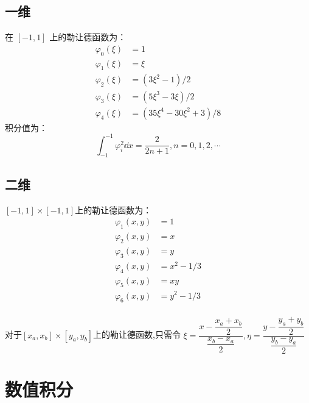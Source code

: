 \documentclass{book}
\begin{document}
\subsection{一维}
在 $[-1,1]$ 上的勒让德函数为：
\begin{equation}
    \begin{aligned}
        \varphi_{0}(\xi) & =1                                        \\
        \varphi_{1}(\xi) & =\xi                                      \\
        \varphi_{2}(\xi) & =\left(3 \xi^{2}-1\right) / 2             \\
        \varphi_{3}(\xi) & =\left(5 \xi^{3}-3 \xi\right) / 2         \\
        \varphi_{4}(\xi) & =\left(35 \xi^{4}-30 \xi^{2}+3\right) / 8
    \end{aligned}
\end{equation}
积分值为：
\begin{equation}
    \int_{-1}^{-1}\varphi_i^2\dd x=\frac{2}{2n+1},n=0,1,2,\cdots
\end{equation}

\subsection{二维}
$[-1,1]\times[-1,1]$上的勒让德函数为：
\begin{equation}
    \begin{aligned}
        \varphi_{1}(x,y) & = 1       \\
        \varphi_{2}(x,y) & = x       \\
        \varphi_{3}(x,y) & = y       \\
        \varphi_{4}(x,y) & = x^2-1/3 \\
        \varphi_{5}(x,y) & = xy      \\
        \varphi_{6}(x,y) & = y^2-1/3 \\
    \end{aligned}
\end{equation}

对于$[x_a,x_b]\times[y_a,y_b]$上的勒让德函数,只需令 $\xi=\dfrac{x - \dfrac{x_a+x_b}{2}}{\dfrac{x_b-x_a}{2}},\eta = \dfrac{y - \dfrac{y_a+y_b}{2}}{\dfrac{y_b-y_a}{2}}$
\section{数值积分}
\end{document}
